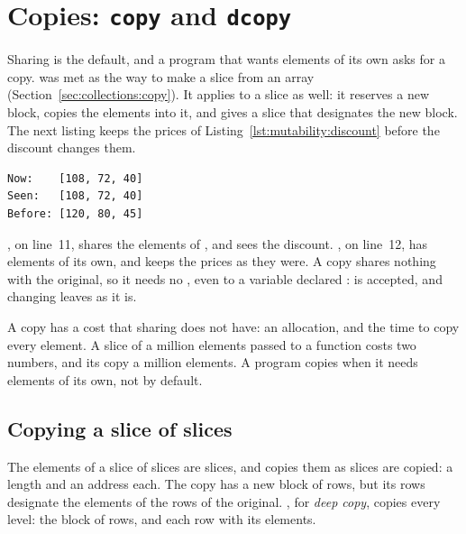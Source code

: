 \vfill\pagebreak
\section{Copies: \texttt{copy} and \texttt{dcopy}}
\label{sec:mutability:copies}

Sharing is the default, and a program that wants elements of its own asks for a
copy.  was met as the way to make a slice from an array
(Section~\ref{sec:collections:copy}). It applies to a slice as well: it
reserves a new block, copies the elements into it, and gives a slice that
designates the new block. The next listing keeps the prices of
Listing~\ref{lst:mutability:discount} before the discount changes them.


\vspace{-10pt}%
\begin{lstlisting}[style=bashVerb]
Now:    [108, 72, 40]
Seen:   [108, 72, 40]
Before: [120, 80, 45]
\end{lstlisting}

, on line~11, shares the elements of , and sees the
discount. , on line~12, has elements of its own, and keeps the
prices as they were. A copy shares nothing with the original, so it needs no
, even to a variable declared :
 is accepted, and changing 
leaves  as it is.

A copy has a cost that sharing does not have: an allocation, and the time to
copy every element. A slice of a million elements passed to a function costs
two numbers, and its copy a million elements. A program copies when it needs
elements of its own, not by default.

\subsection{Copying a slice of slices}

The elements of a slice of slices are slices, and  copies them as
slices are copied: a length and an address each. The copy has a new block of
rows, but its rows designate the elements of the rows of the original.
, for \textit{deep copy}, copies every level: the block of rows,
and each row with its elements.

